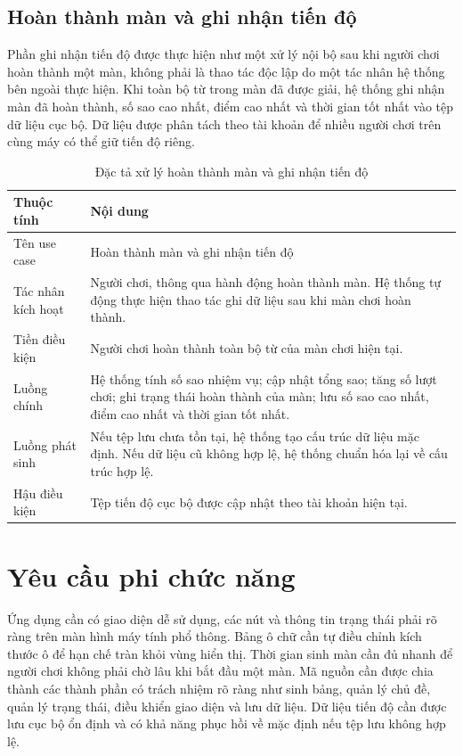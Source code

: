﻿\documentclass[../DoAn.tex]{subfiles}
\begin{document}
\subsection{Hoàn thành màn và ghi nhận tiến độ}
Phần ghi nhận tiến độ được thực hiện như một xử lý nội bộ sau khi người chơi hoàn thành một màn, không phải là thao tác độc lập do một tác nhân hệ thống bên ngoài thực hiện. Khi toàn bộ từ trong màn đã được giải, hệ thống ghi nhận màn đã hoàn thành, số sao cao nhất, điểm cao nhất và thời gian tốt nhất vào tệp dữ liệu cục bộ. Dữ liệu được phân tách theo tài khoản để nhiều người chơi trên cùng máy có thể giữ tiến độ riêng.

\begin{table}[H]
\centering
\begin{tabular}{|p{3.2cm}|p{10.8cm}|}
\hline
\textbf{Thuộc tính} & \textbf{Nội dung} \\ \hline
Tên use case & Hoàn thành màn và ghi nhận tiến độ \\ \hline
Tác nhân kích hoạt & Người chơi, thông qua hành động hoàn thành màn. Hệ thống tự động thực hiện thao tác ghi dữ liệu sau khi màn chơi hoàn thành. \\ \hline
Tiền điều kiện & Người chơi hoàn thành toàn bộ từ của màn chơi hiện tại. \\ \hline
Luồng chính & Hệ thống tính số sao nhiệm vụ; cập nhật tổng sao; tăng số lượt chơi; ghi trạng thái hoàn thành của màn; lưu số sao cao nhất, điểm cao nhất và thời gian tốt nhất. \\ \hline
Luồng phát sinh & Nếu tệp lưu chưa tồn tại, hệ thống tạo cấu trúc dữ liệu mặc định. Nếu dữ liệu cũ không hợp lệ, hệ thống chuẩn hóa lại về cấu trúc hợp lệ. \\ \hline
Hậu điều kiện & Tệp tiến độ cục bộ được cập nhật theo tài khoản hiện tại. \\ \hline
\end{tabular}
\caption{Đặc tả xử lý hoàn thành màn và ghi nhận tiến độ}
\label{table:uc_save}
\end{table}

\section{Yêu cầu phi chức năng}
\label{section:2.4}
Ứng dụng cần có giao diện dễ sử dụng, các nút và thông tin trạng thái phải rõ ràng trên màn hình máy tính phổ thông. Bảng ô chữ cần tự điều chỉnh kích thước ô để hạn chế tràn khỏi vùng hiển thị. Thời gian sinh màn cần đủ nhanh để người chơi không phải chờ lâu khi bắt đầu một màn. Mã nguồn cần được chia thành các thành phần có trách nhiệm rõ ràng như sinh bảng, quản lý chủ đề, quản lý trạng thái, điều khiển giao diện và lưu dữ liệu. Dữ liệu tiến độ cần được lưu cục bộ ổn định và có khả năng phục hồi về mặc định nếu tệp lưu không hợp lệ.
\end{document}
